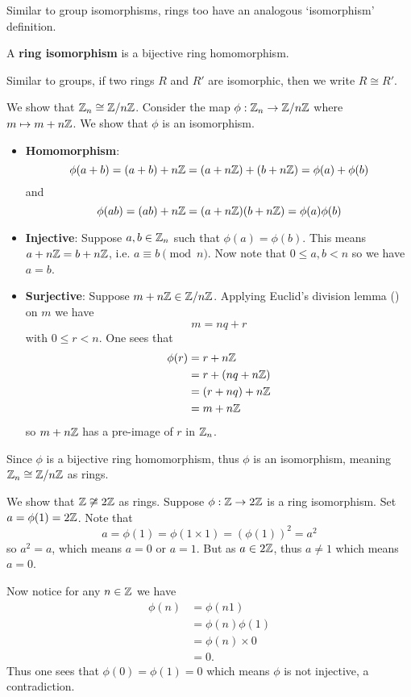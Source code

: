Similar to group isomorphisms, rings too have an analogous `isomorphism' definition.
\begin{definition}
    A \textbf{ring isomorphism} is a bijective ring homomorphism.
\end{definition}
Similar to groups, if two rings $R$ and $R'$ are isomorphic, then we write $R \cong R'$.

\begin{example}\label{example-Zn-ring-isomorphic-to-Z/nZ}
    We show that $\mathbb{Z}_n \cong \mathbb{Z}/n\mathbb{Z}$. Consider the map $\phi:\mathbb{Z}_n \to \mathbb{Z}/n\mathbb{Z}$ where $m \mapsto m + n\mathbb{Z}$. We show that $\phi$ is an isomorphism.
    \begin{itemize}
        \item \textbf{Homomorphism}:
        \[
            \phi(a+b) = (a+b) + n\mathbb{Z} = (a + n\mathbb{Z}) + (b + n\mathbb{Z}) = \phi(a) + \phi(b)
        \]
        and
        \[
            \phi(ab) = (ab) + n\mathbb{Z} = (a+n\mathbb{Z})(b+n\mathbb{Z}) = \phi(a)\phi(b)
        \]

        \item \textbf{Injective}: Suppose $a, b \in \mathbb{Z}_n$ such that $\phi(a) = \phi(b)$. This means $a + n\mathbb{Z} = b + n\mathbb{Z}$, i.e. $a \equiv b \pmod n$. Now note that $0 \leq a,b < n$ so we have $a = b$.

        \item \textbf{Surjective}: Suppose $m + n\mathbb{Z} \in \mathbb{Z}/n\mathbb{Z}$. Applying Euclid's division lemma () on $m$ we have
        \[
            m = nq + r
        \]
        with $0 \leq r < n$. One sees that
        \begin{align*}
            \phi(r) &= r + n\mathbb{Z}\\
            &= r + (nq + n\mathbb{Z})\\
            &= (r + nq) + n\mathbb{Z}\\
            &= m + n\mathbb{Z}
        \end{align*}
        so $m + n\mathbb{Z}$ has a pre-image of $r$ in $\mathbb{Z}_n$.
    \end{itemize}
    Since $\phi$ is a bijective ring homomorphism, thus $\phi$ is an isomorphism, meaning $\mathbb{Z}_n \cong \mathbb{Z}/n\mathbb{Z}$ as rings.
\end{example}
\begin{example}
    We show that $\mathbb{Z} \not\cong 2\mathbb{Z}$ as rings. Suppose $\phi: \mathbb{Z} \to 2\mathbb{Z}$ is a ring isomorphism. Set $a = \phi(1) = 2\mathbb{Z}$. Note that
    \[
        a = \phi(1) = \phi(1\times1) = (\phi(1))^2 = a^2
    \]
    so $a^2 = a$, which means $a = 0$ or $a = 1$. But as $a \in 2\mathbb{Z}$, thus $a \neq 1$ which means $a = 0$.

    Now notice for any $n \in \mathbb{Z}$ we have
    \begin{align*}
        \phi(n) &= \phi(n1)\\
        &= \phi(n)\phi(1)\\
        &= \phi(n) \times 0\\
        &= 0.
    \end{align*}
    Thus one sees that $\phi(0) = \phi(1) = 0$ which means $\phi$ is not injective, a contradiction.
\end{example}


